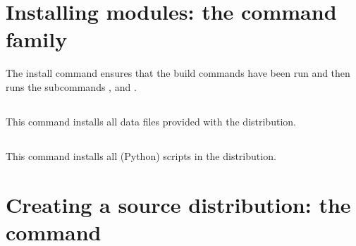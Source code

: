 \documentclass{manual}
\begin{document}




\section{Installing modules: the \protect{} command family}
\label{install-cmd}

The install command ensures that the build commands have been run and then
runs the subcommands ,
 and
.


\subsection{\protect{}}
\label{install-data-cmd}
This command installs all data files provided with the distribution.

\subsection{\protect{}}
\label{install-scripts-cmd}
This command installs all (Python) scripts in the distribution.




\section{Creating a source distribution: the
            \protect{} command}
\label{sdist-cmd}
\end{document}
